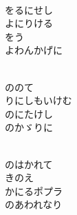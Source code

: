 \documentclass[10pt,b5j]{tarticle} %
\begin{document}
\vspace{1.5em} %
\newcommand{\linespace}{0.5em} %
\newcommand{\blocksize}{0.5\hsize} %
\newcommand{\itemmargin}{3em} %
\begin{enumerate} %
    \setlength{\itemindent}{\itemmargin} %
    \begin{minipage}[c]{\blocksize}
    
        \vspace{\linespace}
        \item~\\
        をるにせし\\
        よにりける\\
        をう\\
        よわんかげに
        
    \end{minipage}
    \begin{minipage}[c]{\blocksize}
        
        \vspace{\linespace}
        \item~\\
        ののて\\
        りにしもいけむ\\
        のにたけし\\
        のかゞりに
        
    \end{minipage}
    \begin{minipage}[c]{\blocksize}
        
        \vspace{\linespace}
        \item~\\
        のはかれて\\
        きのえ\\
        かにるポプラ\\
        のあわれなり
        

\end{minipage}
\end{enumerate}
\end{document}
